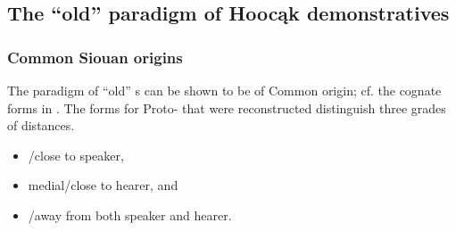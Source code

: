 \documentclass[output=paper]{langsci/langscibook}
\begin{document}
\subsection{{The ``old'' paradigm of Hoocąk demonstratives}}\label{sec:helmbrecht:3.2}

\subsubsection{{Common Siouan origins}}\label{sec:helmbrecht:3.2.1}

The paradigm of ``old'' s can be shown to be of Common  origin; cf. the cognate forms in . The forms for Proto- that were reconstructed distinguish three grades of  distances. 

\begin{itemize}
\item {}\slash close to speaker, 
\item medial\slash close to hearer, and 
\item {}\slash away from both speaker and hearer. 
\end{itemize}
\end{document}
